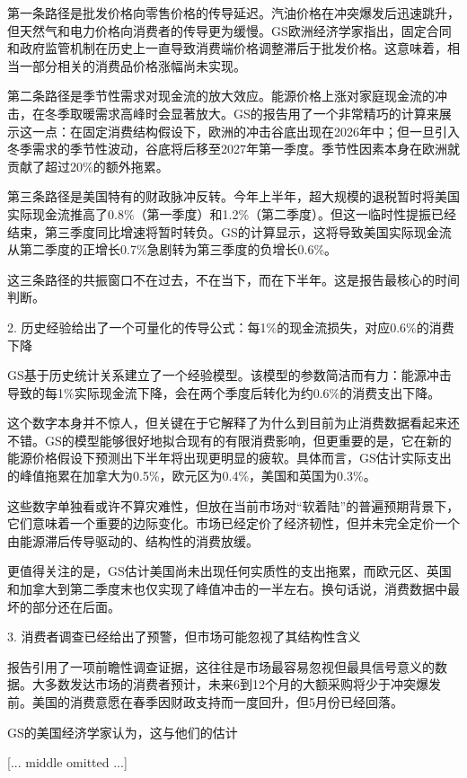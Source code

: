 \documentclass[11pt]{ctexart}
\begin{document}
第一条路径是批发价格向零售价格的传导延迟。汽油价格在冲突爆发后迅速跳升，但天然气和电力价格向消费者的传导更为缓慢。GS欧洲经济学家指出，固定合同和政府监管机制在历史上一直导致消费端价格调整滞后于批发价格。这意味着，相当一部分相关的消费品价格涨幅尚未实现。

第二条路径是季节性需求对现金流的放大效应。能源价格上涨对家庭现金流的冲击，在冬季取暖需求高峰时会显著放大。GS的报告用了一个非常精巧的计算来展示这一点：在固定消费结构假设下，欧洲的冲击谷底出现在2026年中；但一旦引入冬季需求的季节性波动，谷底将后移至2027年第一季度。季节性因素本身在欧洲就贡献了超过20\%的额外拖累。

第三条路径是美国特有的财政脉冲反转。今年上半年，超大规模的退税暂时将美国实际现金流推高了0.8\%（第一季度）和1.2\%（第二季度）。但这一临时性提振已经结束，第三季度同比增速将暂时转负。GS的计算显示，这将导致美国实际现金流从第二季度的正增长0.7\%急剧转为第三季度的负增长0.6\%。

这三条路径的共振窗口不在过去，不在当下，而在下半年。这是报告最核心的时间判断。

2. 历史经验给出了一个可量化的传导公式：每1\%的现金流损失，对应0.6\%的消费下降

GS基于历史统计关系建立了一个经验模型。该模型的参数简洁而有力：能源冲击导致的每1\%实际现金流下降，会在两个季度后转化为约0.6\%的消费支出下降。

这个数字本身并不惊人，但关键在于它解释了为什么到目前为止消费数据看起来还不错。GS的模型能够很好地拟合现有的有限消费影响，但更重要的是，它在新的能源价格假设下预测出下半年将出现更明显的疲软。具体而言，GS估计实际支出的峰值拖累在加拿大为0.5\%，欧元区为0.4\%，美国和英国为0.3\%。

这些数字单独看或许不算灾难性，但放在当前市场对“软着陆”的普遍预期背景下，它们意味着一个重要的边际变化。市场已经定价了经济韧性，但并未完全定价一个由能源滞后传导驱动的、结构性的消费放缓。

更值得关注的是，GS估计美国尚未出现任何实质性的支出拖累，而欧元区、英国和加拿大到第二季度末也仅实现了峰值冲击的一半左右。换句话说，消费数据中最坏的部分还在后面。

3. 消费者调查已经给出了预警，但市场可能忽视了其结构性含义

报告引用了一项前瞻性调查证据，这往往是市场最容易忽视但最具信号意义的数据。大多数发达市场的消费者预计，未来6到12个月的大额采购将少于冲突爆发前。美国的消费意愿在春季因财政支持而一度回升，但5月份已经回落。

GS的美国经济学家认为，这与他们的估计

[... middle omitted ...]
\end{document}
